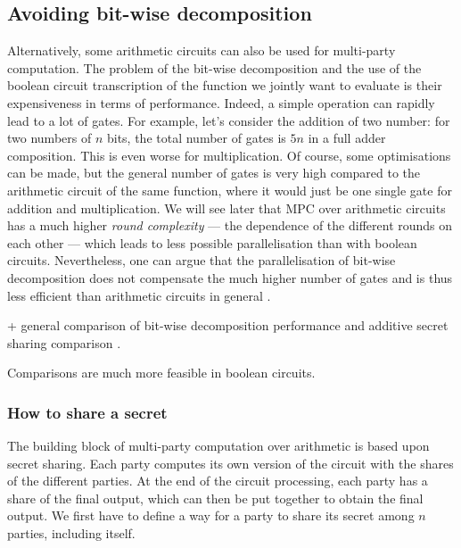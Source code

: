 \subsection{Avoiding bit-wise decomposition}
Alternatively, some arithmetic circuits can also be used for multi-party computation. The problem of the bit-wise decomposition and the use of the boolean circuit transcription of the function we jointly want to evaluate is their expensiveness in terms of performance. Indeed, a simple operation can rapidly lead to a lot of gates. For example, let's consider the addition of two number: for two numbers of $n$ bits, the total number of gates is $5n$ in a full adder composition. This is even worse for multiplication. Of course, some optimisations can be made, but the general number of gates is very high compared to the arithmetic circuit of the same function, where it would just be one single gate for addition and multiplication. We will see later that MPC over arithmetic circuits has a much higher \emph{round complexity} --- the dependence of the different rounds on each other --- which leads to less possible parallelisation than with boolean circuits. Nevertheless, one can argue that the parallelisation of bit-wise decomposition does not compensate the much higher number of gates and is thus less efficient than arithmetic circuits in general \cite{Aly2018PracticallyBit-Decomposition}.

+ general comparison of bit-wise decomposition performance and additive secret sharing comparison \cite{Blom2014AThesis}.

Comparisons are much more feasible in boolean circuits.

\subsubsection{How to share a secret}
The building block of multi-party computation over arithmetic is based upon secret sharing. Each party computes its own version of the circuit with the shares of the different parties. At the end of the circuit processing, each party has a share of the final output, which can then be put together to obtain the final output. We first have to define a way for a party to share its secret among $n$ parties, including itself.

